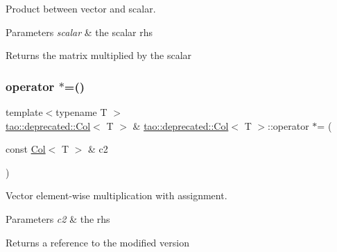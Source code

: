 Product between vector and scalar. 


\begin{DoxyParams}{Parameters}
{\em scalar} & the scalar rhs \\
\hline
\end{DoxyParams}
\begin{DoxyReturn}{Returns}
the matrix multiplied by the scalar 
\end{DoxyReturn}
\mbox{\label{classtao_1_1deprecated_1_1_col_a2c6cb515a46f76797dffdac251f4e3fa}} 
\subsubsection{\texorpdfstring{operator $\ast$=()}{operator *=()}\hspace{0.1cm}{\footnotesize\ttfamily [1/2]}}
{\footnotesize\ttfamily template$<$typename T $>$ \\
\mbox{\hyperlink{classtao_1_1deprecated_1_1_col}{tao\+::deprecated\+::\+Col}}$<$ T $>$ \& \mbox{\hyperlink{classtao_1_1deprecated_1_1_col}{tao\+::deprecated\+::\+Col}}$<$ T $>$\+::operator $\ast$= (\begin{DoxyParamCaption}\item[{const \mbox{\hyperlink{classtao_1_1deprecated_1_1_col}{Col}}$<$ T $>$ \&}]{c2 }\end{DoxyParamCaption})}



Vector element-\/wise multiplication with assignment. 


\begin{DoxyParams}{Parameters}
{\em c2} & the rhs \\
\hline
\end{DoxyParams}
\begin{DoxyReturn}{Returns}
a reference to the modified version 
\end{DoxyReturn}
\mbox{\label{classtao_1_1deprecated_1_1_col_a8074f1bab1ce2042f77de21c6a21867d}} 
